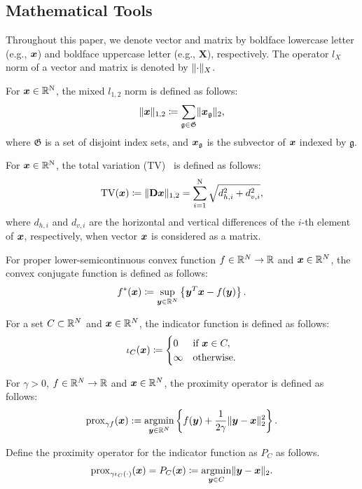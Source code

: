 \subsection{Mathematical Tools}\label{subsec:mathematical-tools}

Throughout this paper, we denote vector and matrix by boldface lowercase letter (e.g., $\vecx$) and boldface uppercase letter (e.g., $\bm{X}$), respectively.
The operator $l_{X}$ norm of a vector and matrix is denoted by $\Norm{\cdot}__{X}$.

For $\vecx \in \realNumber^{\intN}$, the mixed $l_{1,2}$ norm is defined as follows:
\begin{equation} \label{eq:L12NormDefinitionEq} \LOneTwoNormDefinition, \end{equation}
where $\mathfrak{G}$ is a set of disjoint index sets, and $\vecx_{\mathfrak{g}}$ is the subvector of $\vecx$ indexed by $\mathfrak{g}$.

For $\vecx \in \realNumber^{\intN}$, the total variation (TV)~\cite{TV} is defined as follows:
\begin{equation} \label{eq:TVDefinitionEq} \TotalVariationDefinition, \end{equation}
where $d_{h,i}$ and $d_{v,i}$ are the horizontal and vertical differences of the $i$-th element of $\vecx$, respectively, when vector $\vecx$ is considered as a matrix.

For proper lower-semicontinuous convex function $f \in \realNumber^N \to \realNumber$ and $\vecx \in \realNumber^N$, the convex conjugate function is defined as follows:
\begin{equation} \label{eq:ConjugateFunctionDefinitionEq} \conjugateFunctionDefinition. \end{equation}

For a set $C \subset \realNumber^N$ and $\vecx \in \realNumber^N$, the indicator function is defined as follows:
\begin{equation} \label{eq:IndicatorFunctionDefinitionEq} \indicatorFunctionDefinition \end{equation}

For $\gamma > 0$, $f \in \realNumber^N \to \realNumber$ and $\vecx \in \realNumber^N$, the proximity operator is defined as follows:
\begin{equation} \label{eq:ProximityOperatorDefinitionEq} \proximityOperatorDefinition. \end{equation}

Define the proximity operator for the indicator function as $P_C$ as follows.
\begin{equation} \label{eq:ProximityOperatorDefinitionWithIndicatorFunctionEq}
\proximityOperator{ \gamma \indicatorFunction{C}{\cdot} }{\vecx} = P_C(\vecx) \coloneq \argmin{\vecy \in C} \LTwoNorm{\vecy - \vecx}.
\end{equation}

